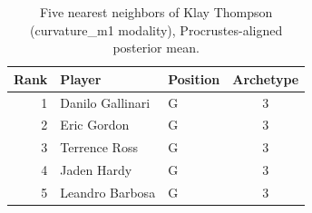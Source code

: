 \begin{table}[htbp]
  \centering\small
  \begin{tabular}{rllc}
    \toprule
    Rank & Player & Position & Archetype \\
    \midrule
    1 & Danilo Gallinari & G & 3 \\
    2 & Eric Gordon & G & 3 \\
    3 & Terrence Ross & G & 3 \\
    4 & Jaden Hardy & G & 3 \\
    5 & Leandro Barbosa & G & 3 \\
    \bottomrule
  \end{tabular}
  \caption{Five nearest neighbors of Klay Thompson (curvature_m1 modality), Procrustes-aligned posterior mean.}
  \label{tab:Klay_Thompson_neighbors_curvature_m1}
\end{table}

